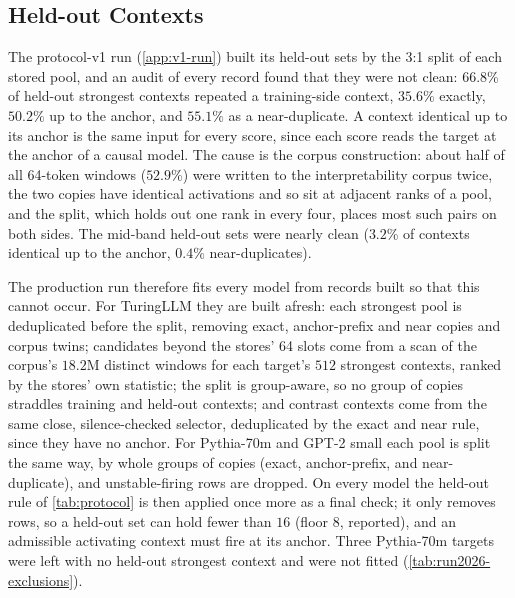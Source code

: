 \documentclass[10pt]{article}
\newif\ifexternal
\DeclareRobustCommand{\pending}[1]{%
  \ifexternal
    \ifvmode\textcolor{black!55}{[to be added]}\else\unskip\fi
  \else
    \textcolor{red!70!black}{[\textit{pending: #1}]}%
  \fi}
\begin{document}
\subsection{Held-out Contexts}
\label{app:heldout}
The protocol-v1 run (\cref{app:v1-run}) built its held-out sets by the 3:1 split of each stored pool, and an audit of every record found that they were not clean: $66.8\%$ of held-out strongest contexts repeated a training-side context, $35.6\%$ exactly, $50.2\%$ up to the anchor, and $55.1\%$ as a near-duplicate.
A context identical up to its anchor is the same input for every score, since each score reads the target at the anchor of a causal model.
The cause is the corpus construction: about half of all 64-token windows ($52.9\%$) were written to the interpretability corpus twice, the two copies have identical activations and so sit at adjacent ranks of a pool, and the split, which holds out one rank in every four, places most such pairs on both sides.
The mid-band held-out sets were nearly clean ($3.2\%$ of contexts identical up to the anchor, $0.4\%$ near-duplicates).

The production run therefore fits every model from records built so that this cannot occur.
For TuringLLM they are built afresh: each strongest pool is deduplicated before the split, removing exact, anchor-prefix and near copies and corpus twins; candidates beyond the stores' 64 slots come from a scan of the corpus's $18.2$M distinct windows for each target's $512$ strongest contexts, ranked by the stores' own statistic; the split is group-aware, so no group of copies straddles training and held-out contexts; and contrast contexts come from the same close, silence-checked selector, deduplicated by the exact and near rule, since they have no anchor.
For Pythia-70m and GPT-2 small each pool is split the same way, by whole groups of copies (exact, anchor-prefix, and near-duplicate), and unstable-firing rows are dropped.
On every model the held-out rule of \cref{tab:protocol} is then applied once more as a final check; it only removes rows, so a held-out set can hold fewer than $16$ (floor $8$, reported), and an admissible activating context must fire at its anchor.
Three Pythia-70m targets were left with no held-out strongest context and were not fitted (\cref{tab:run2026-exclusions}).
\end{document}
